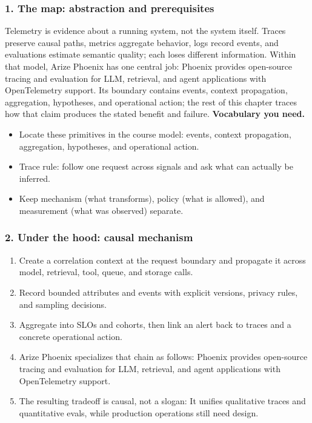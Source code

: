 \subsubsection*{1. The map: abstraction and prerequisites}
Telemetry is evidence about a running system, not the system itself. Traces preserve causal paths, metrics aggregate behavior, logs record events, and evaluations estimate semantic quality; each loses different information.
Within that model, Arize Phoenix has one central job: Phoenix provides open-source tracing and evaluation for LLM, retrieval, and agent applications with OpenTelemetry support. Its boundary contains events, context propagation, aggregation, hypotheses, and operational action; the rest of this chapter traces how that claim produces the stated benefit and failure.
\textbf{Vocabulary you need.}\begin{itemize}
\item Locate these primitives in the course model: events, context propagation, aggregation, hypotheses, and operational action.
\item Trace rule: follow one request across signals and ask what can actually be inferred.
\item Keep mechanism (what transforms), policy (what is allowed), and measurement (what was observed) separate.
\end{itemize}
\subsubsection*{2. Under the hood: causal mechanism}\begin{enumerate}
\item Create a correlation context at the request boundary and propagate it across model, retrieval, tool, queue, and storage calls.
\item Record bounded attributes and events with explicit versions, privacy rules, and sampling decisions.
\item Aggregate into SLOs and cohorts, then link an alert back to traces and a concrete operational action.
\item Arize Phoenix specializes that chain as follows: Phoenix provides open-source tracing and evaluation for LLM, retrieval, and agent applications with OpenTelemetry support.
\item The resulting tradeoff is causal, not a slogan: It unifies qualitative traces and quantitative evals, while production operations still need design.
\end{enumerate}
